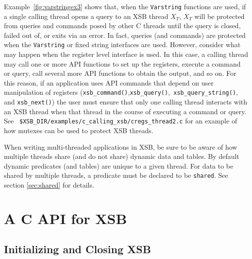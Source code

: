 Example~\ref{fig:varstringex3} shows that, when the {\tt Varstring}
functions are used, if a single calling thread opens a query to an XSB
thread $X_T$, $X_T$ will be protected from queries and commands posed
by other C threads until the query is closed, failed out of, or exits
via an error.  In fact, queries (and commands) are protected when the
{\tt Varstring} or fixed string interfaces are used.  However,
consider what may happen when the register level interface is used.
In this case, a calling thread may call one or more API functions to
set up the registers, execute a command or query, call several more
API functions to obtain the output, and so on.  For this reason, if an
application uses API commands that depend on user manipulation of
registers ({\tt xsb\_command()},{\tt xsb\_query()},{\tt
  xsb\_query\_string()}, and {\tt xsb\_next()}) the user must ensure
that only one calling thread interacts with an XSB thread when that
thread in the course of executing a command or query.  See {\tt
  \$XSB\_DIR/examples/c\_calling\_xsb/cregs\_thread2.c} for an example
of how mutexes can be used to protect XSB threads.

When writing multi-threaded applications in XSB, be sure to be aware
of how multiple threads share (and do not share) dynamic data and
tables.  By default dynamic predicates (and tables) are unique to a
given thread.  For data to be shared by multiple threads, a predicate
must be declared to be {\tt shared}.  See section \ref{sec:shared} for
details.

\section{A C API for XSB} \label{sec:CAPI}
%
\subsection{Initializing and Closing XSB}

